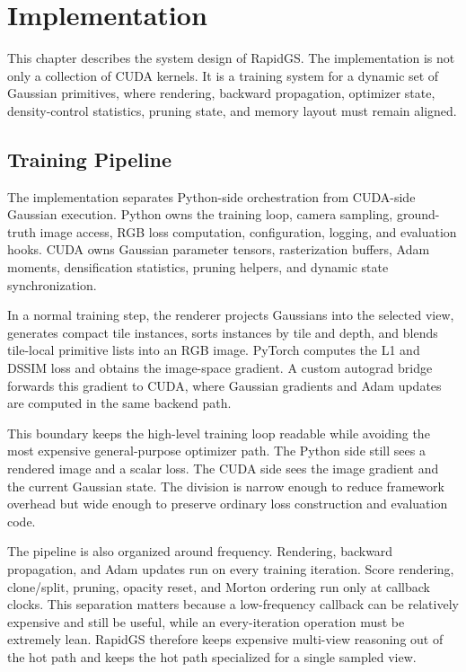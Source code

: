 \chapter{Implementation}
\label{chap:implementation}

This chapter describes the system design of RapidGS. The implementation is not only a collection of CUDA kernels. It is a training system for a dynamic set of Gaussian primitives, where rendering, backward propagation, optimizer state, density-control statistics, pruning state, and memory layout must remain aligned.

\section{Training Pipeline}

The implementation separates Python-side orchestration from CUDA-side Gaussian execution. Python owns the training loop, camera sampling, ground-truth image access, RGB loss computation, configuration, logging, and evaluation hooks. CUDA owns Gaussian parameter tensors, rasterization buffers, Adam moments, densification statistics, pruning helpers, and dynamic state synchronization.

In a normal training step, the renderer projects Gaussians into the selected view, generates compact tile instances, sorts instances by tile and depth, and blends tile-local primitive lists into an RGB image. PyTorch computes the L1 and DSSIM loss and obtains the image-space gradient. A custom autograd bridge forwards this gradient to CUDA, where Gaussian gradients and Adam updates are computed in the same backend path.

This boundary keeps the high-level training loop readable while avoiding the most expensive general-purpose optimizer path. The Python side still sees a rendered image and a scalar loss. The CUDA side sees the image gradient and the current Gaussian state. The division is narrow enough to reduce framework overhead but wide enough to preserve ordinary loss construction and evaluation code.

The pipeline is also organized around frequency. Rendering, backward propagation, and Adam updates run on every training iteration. Score rendering, clone/split, pruning, opacity reset, and Morton ordering run only at callback clocks. This separation matters because a low-frequency callback can be relatively expensive and still be useful, while an every-iteration operation must be extremely lean. RapidGS therefore keeps expensive multi-view reasoning out of the hot path and keeps the hot path specialized for a single sampled view.

